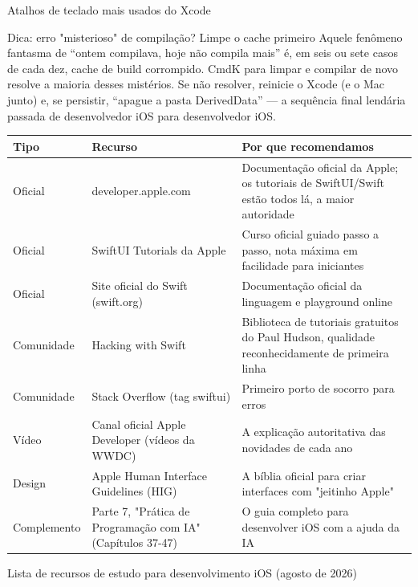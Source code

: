 \begin{center}\small\color{gray}Atalhos de teclado mais usados do Xcode\end{center}

\begin{tcbinfo}{Dica: erro "misterioso" de compilação? Limpe o cache primeiro}
Aquele fenômeno fantasma de “ontem compilava, hoje não compila mais” é, em seis ou sete casos de cada dez, cache de build corrompido. CmdK para limpar e compilar de novo resolve a maioria desses mistérios. Se não resolver, reinicie o Xcode (e o Mac junto) e, se persistir, “apague a pasta DerivedData” — a sequência final lendária passada de desenvolvedor iOS para desenvolvedor iOS.

\end{tcbinfo}



\begin{center}
\begin{tabularx}{\linewidth}{|X|X|X|}
\hline
\textbf{Tipo} & \textbf{Recurso} & \textbf{Por que recomendamos} \tabularnewline
\hline
Oficial & developer.apple.com & Documentação oficial da Apple; os tutoriais de SwiftUI/Swift estão todos lá, a maior autoridade \tabularnewline
Oficial & SwiftUI Tutorials da Apple & Curso oficial guiado passo a passo, nota máxima em facilidade para iniciantes \tabularnewline
Oficial & Site oficial do Swift (swift.org) & Documentação oficial da linguagem e playground online \tabularnewline
Comunidade & Hacking with Swift & Biblioteca de tutoriais gratuitos do Paul Hudson, qualidade reconhecidamente de primeira linha \tabularnewline
Comunidade & Stack Overflow (tag swiftui) & Primeiro porto de socorro para erros \tabularnewline
Vídeo & Canal oficial Apple Developer (vídeos da WWDC) & A explicação autoritativa das novidades de cada ano \tabularnewline
Design & Apple Human Interface Guidelines (HIG) & A bíblia oficial para criar interfaces com "jeitinho Apple" \tabularnewline
Complemento & Parte 7, "Prática de Programação com IA" (Capítulos 37-47) & O guia completo para desenvolver iOS com a ajuda da IA \tabularnewline
\hline
\end{tabularx}
\end{center}

\begin{center}\small\color{gray}Lista de recursos de estudo para desenvolvimento iOS (agosto de 2026)\end{center}

